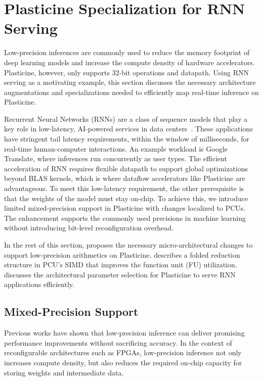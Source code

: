 \section{Plasticine Specialization for RNN Serving} \label{sec:rnn_arch}

Low-precision inferences are commonly used to reduce the memory footprint of deep learning models and
increase the compute density of hardware accelerators.
Plasticine, however, only supports 32-bit operations and datapath.
Using RNN serving as a motivating example, this section discusses the necessary architecture
augmentations and specializations needed to efficiently map real-time inference on Plasticine.

Recurrent Neural Networks (RNNs) are a class of sequence models that play a key role
in low-latency, AI-powered services in data centers~\cite{fowers2018configurable, jouppi2017datacenter}.
These applications have stringent tail latency requirements, within the window of milliseconds,
for real-time human-computer interactions.
An example workload is
Google Translate, where inferences run concurrently as user types.
The efficient acceleration of RNN requires flexible datapath to support global optimizations beyond BLAS kernels, which is where dataflow accelerators like Plasticine are advantageous.
To meet this low-latency requirement, the other prerequisite is that the weights of the model must stay on-chip.
To achieve this, we introduce limited mixed-precision support in Plasticine with changes localized to PCUs. 
The enhancement supports the commonly used precisions in machine learning without introducing bit-level reconfiguration overhead.

In the rest of this section,  proposes the necessary micro-architectural changes to support low-precision arithmetics on Plasticine.
 describes a folded reduction structure in PCU's SIMD that improves the function
unit (FU) utilization.
 discusses the architectural parameter selection for Plasticine to serve RNN applications efficiently.

\subsection{Mixed-Precision Support} \label{sec:lowprec}
\label{sec:arch:varprec}
Previous works \cite{fowers2018configurable, jouppi2017datacenter}
  have shown that low-precision inference can deliver promising performance
  improvements without sacrificing accuracy.
In the context of reconfigurable architectures such as FPGAs,
  low-precision inference not only increases compute density,
  but also reduces the required on-chip capacity for
  storing weights and intermediate data.

